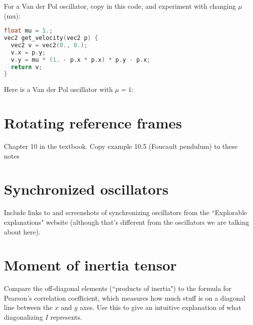 \documentclass{article}
\begin{document}
For a Van der Pol oscillator, copy in this code, and experiment with changing $\mu$ (mu):
\begin{lstlisting}[language=C]
float mu = 1.;
vec2 get_velocity(vec2 p) {
  vec2 v = vec2(0., 0.);
  v.x = p.y;
  v.y = mu * (1. - p.x * p.x) * p.y - p.x;
  return v;
}
\end{lstlisting}
Here is a Van der Pol oscillator with $\mu = 1$:

\section{Rotating reference frames}
Chapter 10 in the textbook. Copy example 10.5 (Foucault pendulum) to these notes

\section{Synchronized oscillators}
Include links to and screenshots of synchronizing oscillators from the ``Explorable explanations" website (although that's different from the oscillators we are talking about here).

\section{Moment of inertia tensor}
Compare the off-diagonal elements (``products of inertia") to the formula for Pearson's correlation coefficient, which measures how much stuff is on a diagonal line between the $x$ and $y$ axes. Use this to give an intuitive explanation of what diagonalizing $I$ represents.
\end{document}
